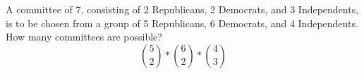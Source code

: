 \item A committee of 7, consisting of 2 Republicans, 2 Democrats, and 3 Independents, is to be chosen from a group of 5 Republicans, 6 Democrats, and 4 Independents. How many committees are possible?
\[ \binom{5}{2} * \binom{6}{2} * \binom{4}{3} \]